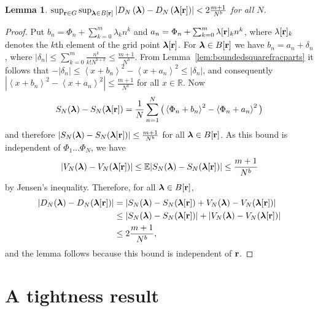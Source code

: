 \documentclass[aap]{imsart}
\newcommand{\reals}{{\mathbb R}}
\newcommand{\expect}{{\mathbb E}}
\newcommand{\fracpart}[1]{\left\langle #1 \right\rangle}
\newcommand{\sabs}[1]{\vert #1 \vert}
\newtheorem{lemma}{Lemma}
\begin{document}
 \begin{lemma}\label{lem:supBVn} $\sup_{\mathbf{r}\in G}\sup_{ \boldsymbol{\lambda}  \in B[\mathbf{r}] }\left\vert D_N\left(  \boldsymbol{\lambda} \right) - D_N\left(  \boldsymbol{\lambda}[\mathbf{r}] \right)\right\vert < 2\frac{m+1}{N^b}$ for all $N$.
 \end{lemma}
 \begin{proof}
Put $b_n = \Phi_n + \sum_{k = 0}^{m}{\lambda_k n^k}$ and $a_n = \Phi_n + \sum_{k = 0}^{m}{\lambda[\mathbf{r}]_k n^k}$, where $\lambda[\mathbf{r}]_k$ denotes the $k$th element of the grid point $\boldsymbol{\lambda}[\mathbf{r}]$. For $\boldsymbol{\lambda} \in B[\mathbf{r}]$ we have $b_n = a_n + \delta_n$,
where $\sabs{\delta_n} \leq \sum_{k=0}^m\frac{n^k}{k! N^{b+k}} \leq \frac{m+1}{N^{b}}$.  From Lemma~\ref{lem:boundedsquarefracparts} it follows that $-|\delta_n| \leq \fracpart{x + b_n}^2 -  \fracpart{x + a_n}^2  \leq |\delta_n|$,
and consequently $|\fracpart{x + b_n}^2 -  \fracpart{x + a_n}^2| \leq \tfrac{m+1}{N^b}$ for all $x \in \reals$. Now
\[
S_N(\lambdabf) - S_N(\lambdabf[\rbf]) =  \frac{1}{N}\sum_{n=1}^{N}\big( \fracpart{\Phi_n + b_n}^2 -  \fracpart{\Phi_n + a_n}^2 \big)
\]
and therefore $\sabs{S_N(\lambdabf) - S_N(\lambdabf[\rbf])} \leq \frac{m+1}{N^b}$ for all $\boldsymbol{\lambda} \in B[\mathbf{r}]$.  As this bound is independent of $\Phi_1 \dots \Phi_N$, we have
\[
\sabs{ V_N(\lambdabf) - V_N(\lambdabf[\rbf])} \leq \expect \sabs{ S_N(\lambdabf) - S_N(\lambdabf[\rbf])} \leq \frac{m+1}{N^b}
\]
by Jensen's inequality.  Therefore, for all $\boldsymbol{\lambda} \in B[\mathbf{r}]$,
 \begin{align*}
 \sabs{ D_N(\lambdabf) - D_N(\lambdabf[\rbf]) } &= \sabs{ S_N(\lambdabf) - S_N(\lambdabf[\rbf]) + V_N(\lambdabf) - V_N(\lambdabf[\rbf]) } \\
&\leq \sabs{ S_N(\lambdabf) - S_N(\lambdabf[\rbf]) \vert + \vert V_N(\lambdabf) - V_N(\lambdabf[\rbf]) } \\
&\leq 2\frac{m+1}{N^{b}},
\end{align*}
and the lemma follows because this bound is independent of $\mathbf{r}$.
 \end{proof}


\section{A tightness result}\label{app:tightness-result}
\end{document}
